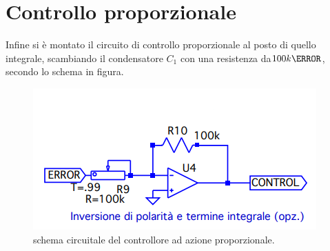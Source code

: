 \documentclass[10pt, a4paper, italian]{article}
\begin{document}
\section{Controllo proporzionale}
Infine si è montato il circuito di controllo proporzionale al posto di quello integrale, scambiando il condensatore $C_1$ con una resistenza da$100 k\ohm$, secondo lo schema in figura.
\begin{figure}[H]
    \centering
	\includegraphics[scale=0.4]{controlgenprop}
    \caption{schema circuitale del controllore ad azione proporzionale.
    \label{fig: Draft1}}
\end{figure}
\end{document}
